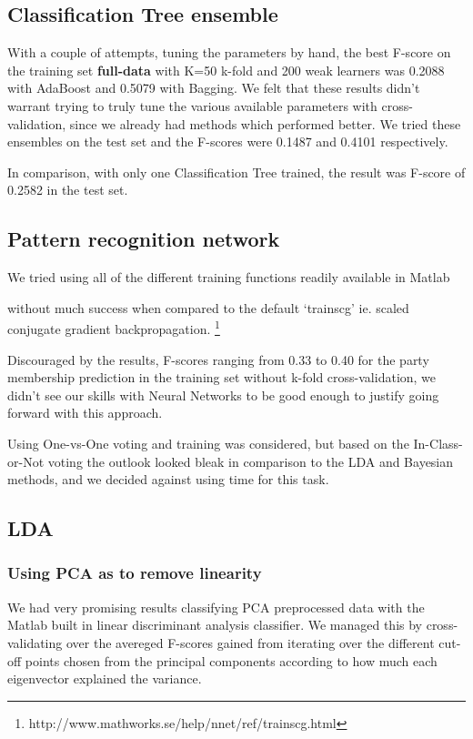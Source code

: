 \documentclass[a4paper,10pt]{article}
\begin{document}
\subsection{Classification Tree ensemble}
With a couple of attempts, tuning the parameters by hand, the best F-score on the training set {\bf full-data} with K=50 k-fold and 200 weak learners was 0.2088 with AdaBoost and 0.5079 with Bagging. We felt that these results didn’t warrant trying to truly tune the various available parameters with cross-validation, since we already had methods which performed better. We tried these ensembles on the test set and the F-scores were 0.1487 and 0.4101 respectively.

In comparison, with only one Classification Tree trained, the result was F-score of 0.2582 in the test set.

\subsection{Pattern recognition network}

We tried using all of the different training functions readily available in Matlab

without much success when compared to the default ‘trainscg’ ie. scaled conjugate gradient backpropagation. \footnote{http://www.mathworks.se/help/nnet/ref/trainscg.html}

Discouraged by the results, F-scores ranging from 0.33 to 0.40 for the party membership prediction in the training set without k-fold cross-validation, we didn’t see our skills with Neural Networks to be good enough to justify going forward with this approach.

Using One-vs-One voting and training was considered, but based on the In-Class-or-Not voting the outlook looked bleak in comparison to the LDA and Bayesian methods, and we decided against using time for this task.

\subsection{LDA}
\subsubsection{Using PCA as to remove linearity}
We had very promising results classifying PCA preprocessed data with the Matlab built in linear discriminant analysis classifier. We managed this by cross-validating over the avereged F-scores gained from iterating over the different cut-off points chosen from the principal components according to how much each eigenvector explained the variance.
\end{document}
